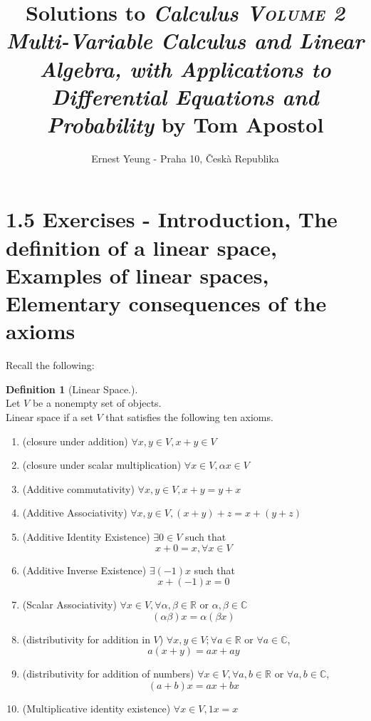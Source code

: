 \documentclass[twoside]{amsart}
\title{	Solutions to \emph{ Calculus \textsc{ Volume 2} Multi-Variable Calculus and Linear Algebra, with Applications to Differential Equations and Probability } by Tom Apostol }
\author{
  Ernest Yeung - Praha 10, \v Cesk\`a Republika 
       }
\theoremstyle{plain}
\theoremstyle{definition}
\newtheorem{definition}{Definition}
\begin{document}

\maketitle

\section*{ 1.5 Exercises - Introduction, The definition of a linear space, Examples of linear spaces, Elementary consequences of the axioms }

Recall the following:
\begin{definition}[Linear Space.] \quad \\
  Let $V$ be a nonempty set of objects.  \\
  Linear space if a set $V$ that satisfies the following ten axioms. 
  \begin{enumerate}
  \item (closure under addition) $\forall x,y \in V, x+y \in V$  
  \item (closure under scalar multiplication) $\forall x \in V, \alpha x \in V$  
  \item (Additive commutativity) $\forall x, y \in V, x+y = y+x$ 
  \item (Additive Associativity) $\forall x,y \in V, (x+y) + z = x + (y+z)$  
  \item (Additive Identity Existence) $\exists 0 \in V$ such that 
\[
x+ 0 = x, \forall x \in V
\]
\item (Additive Inverse Existence) $\exists (-1) x $ such that 
\[
x + (-1)x = 0 
\]
\item (Scalar Associativity) $\forall x \in V, \forall \alpha, \beta \in \mathbb{R} \text{ or } \alpha, \beta \in \mathbb{C}$
\[
(\alpha \beta)x = \alpha (\beta x)
\]
\item (distributivity for addition in $V$) $\forall x, y \in V; \forall a \in \mathbb{R}$ or $\forall a \in \mathbb{C}$, 
\[
a(x+y) = ax + ay
\]
\item (distributivity for addition of numbers) $\forall x \in V, \forall a, b \in \mathbb{R}$ or $\forall a,b \in \mathbb{C}$,
\[
(a+b)x = ax+bx
\]
\item (Multiplicative identity existence) $\forall x \in V, 1 x =x$
  \end{enumerate}
\end{definition}
\end{document}
